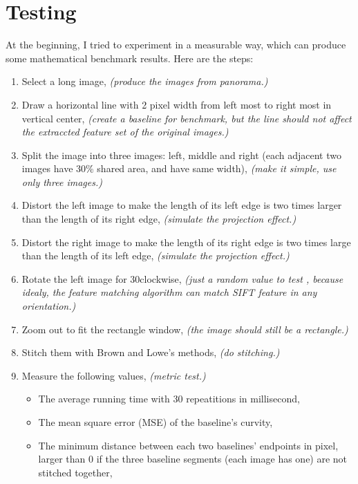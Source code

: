 \documentclass[10pt,twocolumn,letterpaper]{article}
\begin{document}


\section{Testing}
At the beginning, I tried to experiment in a measurable way, which can produce some mathematical benchmark results. Here are the steps:
\begin{enumerate}
    \item Select a long image, \textit{(produce the images from panorama.)}
    \item Draw a horizontal line with 2 pixel width from left most to right most in vertical center, \textit{(create a baseline for benchmark, but the line should not affect the extraccted feature set of the original images.)}
    \item Split the image into three images: left, middle and right (each adjacent two images have 30\% shared area, and have same width), \textit{(make it simple, use only three images.)}
    \item Distort the left image to make the length of its left edge is two times larger than the length of its right edge, \textit{(simulate the projection effect.)}
    \item Distort the right image to make the length of its right edge is two times large than the length of its left edge, \textit{(simulate the projection effect.)}
    \item Rotate the left image for 30\degree clockwise, \textit{(just a random value to test , because idealy, the feature matching algorithm can match SIFT feature in any orientation.)}
    \item Zoom out to fit the rectangle window, \textit{(the image should still be a rectangle.)}
    \item Stitch them with Brown and Lowe's methods, \textit{(do stitching.)}
    \item Measure the following values, \textit{(metric test.)} 
    \begin{itemize}
        \item The average running time with 30 repeatitions in millisecond,
        \item The mean square error (MSE) of the baseline's curvity,
        \item The minimum distance between each two baselines' endpoints in pixel, larger than 0 if the three baseline segments (each image has one) are not stitched together,
    \end{itemize}
\end{enumerate}
\end{document}
